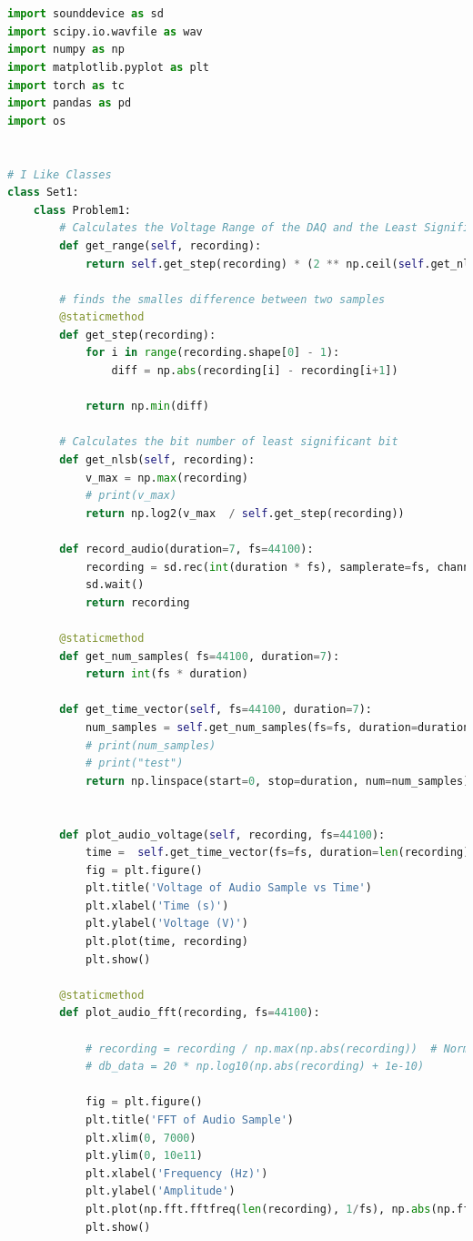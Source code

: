 \documentclass[]{report}
\begin{document}
\begin{lstlisting}[language=Python]


import sounddevice as sd
import scipy.io.wavfile as wav
import numpy as np
import matplotlib.pyplot as plt
import torch as tc
import pandas as pd
import os


# I Like Classes
class Set1:
	class Problem1:
		# Calculates the Voltage Range of the DAQ and the Least Significant Bit
		def get_range(self, recording):
			return self.get_step(recording) * (2 ** np.ceil(self.get_nlsb(recording)))
		
		# finds the smalles difference between two samples
		@staticmethod
		def get_step(recording):
			for i in range(recording.shape[0] - 1):
				diff = np.abs(recording[i] - recording[i+1])
		
			return np.min(diff)
		
		# Calculates the bit number of least significant bit
		def get_nlsb(self, recording):
			v_max = np.max(recording)
			# print(v_max)
			return np.log2(v_max  / self.get_step(recording))
		
		def record_audio(duration=7, fs=44100):
			recording = sd.rec(int(duration * fs), samplerate=fs, channels=2)
			sd.wait()
			return recording
		
		@staticmethod
		def get_num_samples( fs=44100, duration=7):
			return int(fs * duration)
		
		def get_time_vector(self, fs=44100, duration=7):
			num_samples = self.get_num_samples(fs=fs, duration=duration)
			# print(num_samples)
			# print("test")
			return np.linspace(start=0, stop=duration, num=num_samples)
		
		
		def plot_audio_voltage(self, recording, fs=44100):
			time =  self.get_time_vector(fs=fs, duration=len(recording)/fs)
			fig = plt.figure()
			plt.title('Voltage of Audio Sample vs Time')
			plt.xlabel('Time (s)')
			plt.ylabel('Voltage (V)')
			plt.plot(time, recording)
			plt.show()
		
		@staticmethod
		def plot_audio_fft(recording, fs=44100):
		
			# recording = recording / np.max(np.abs(recording))  # Normalize amplitude
			# db_data = 20 * np.log10(np.abs(recording) + 1e-10)
		
			fig = plt.figure()
			plt.title('FFT of Audio Sample')
			plt.xlim(0, 7000) 
			plt.ylim(0, 10e11)
			plt.xlabel('Frequency (Hz)')
			plt.ylabel('Amplitude')	
			plt.plot(np.fft.fftfreq(len(recording), 1/fs), np.abs(np.fft.fft(recording)))
			plt.show()
		

\end{lstlisting}
\end{document}
